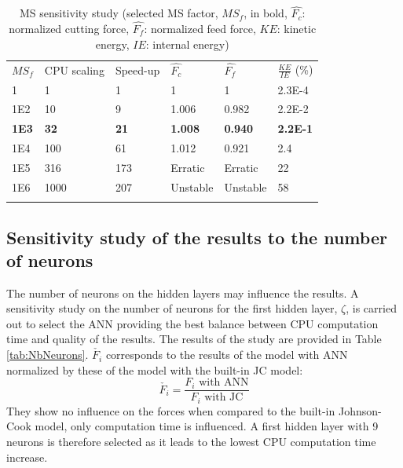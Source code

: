 \documentclass[preprint,12pt,times]{elsarticle}
\begin{document}
%
\begin{table}[!h]
\begin{center}
\caption{\label{tab:MS} MS sensitivity study (selected MS factor, $MS_f$, in bold, $\hat{F_c}$: normalized cutting force, $\hat{F_f}$: normalized feed force, $KE$: kinetic energy, $IE$: internal energy)}
\begin{tabular}{llllll}
\hline\noalign{\smallskip}
$MS_f$ & CPU scaling & Speed-up & $\hat{F_c}$ & $\hat{F_f}$ & $\frac{KE}{IE}$ (\%)\\
\noalign{\smallskip}\hline\noalign{\smallskip}
1 & 1 & 1 & 1 & 1 & \num{2.3E-4}\\
\num{1E2} & 10 & 9 & 1.006 & 0.982 & \num{2.2E-2}\\
\textbf{\num{1E3}} & \textbf{32} & \textbf{21} & \textbf{1.008} & \textbf{0.940} & \textbf{\num{2.2E-1}}\\
\num{1E4} & 100 & 61 & 1.012 & 0.921 & 2.4\\
\num{1E5} & 316 & 173 & Erratic & Erratic & 22\\
\num{1E6} & 1000 & 207 & Unstable & Unstable & 58\\
\noalign{\smallskip}\hline
\end{tabular}
\end{center}
\end{table}
%

\subsection{Sensitivity study of the results to the number of neurons}
\label{subsec:nberneu}

The number of neurons on the hidden layers may influence the results. A sensitivity study on the number of neurons for the first hidden layer, $\zeta$, is carried out to select the ANN providing the best balance between CPU computation time and quality of the results. The results of the study are provided in Table \ref{tab:NbNeurons}. $\check{F_i}$ corresponds to the results of the model with ANN normalized by these of the model with the built-in JC model:
%
\begin{equation}
\check{F_i} = \frac{F_i\text{ with ANN}}{F_i\text{ with JC}}
\end{equation}
%
They show no influence on the forces when compared to the built-in Johnson-Cook model, only computation time is influenced. A first hidden layer with 9 neurons is therefore selected as it leads to the lowest CPU computation time increase.
\end{document}
